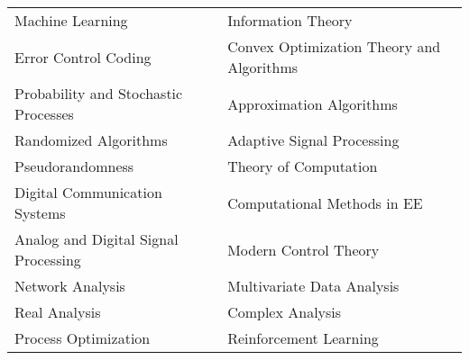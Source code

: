 \documentclass[margin, 11pt]{res} %
\begin{document}
\begin{resume}
\setlength\tabcolsep{15pt}
\begin{tabular}{ll}
	Machine Learning & Information Theory \\
	Error Control Coding & Convex Optimization Theory and Algorithms\\
	Probability and Stochastic Processes & Approximation Algorithms \\ 
	Randomized Algorithms & Adaptive Signal Processing \\
	Pseudorandomness & Theory of Computation \\
	Digital Communication Systems & Computational Methods in EE \\ 
	Analog and Digital Signal Processing & Modern Control Theory\\
	Network Analysis & Multivariate Data Analysis\\
	Real Analysis & Complex Analysis\\
	Process Optimization & Reinforcement Learning\\
\end{tabular}




\end{resume}
\end{document}
